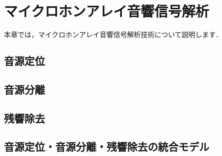 ﻿\chapter{マイクロホンアレイ音響信号解析}

\begin{leadbox}
本章では，マイクロホンアレイ音響信号解析技術について説明します．
\end{leadbox}

\section{音源定位}

\section{音源分離}

\section{残響除去}

\section{音源定位・音源分離・残響除去の統合モデル}
